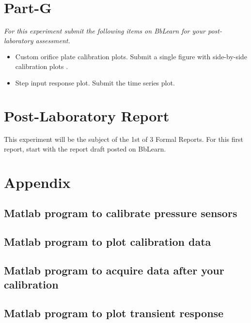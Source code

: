 \documentclass{article} %
\begin{document}
\section{Part-G}
\emph{For this experiment submit the following items on BbLearn for your post-laboratory assessment.}
\begin{itemize}
\item Custom orifice plate calibration plots. Submit a single figure with side-by-side calibration plots .
\item Step input response plot. Submit the time series plot.
\end{itemize}

\section{Post-Laboratory Report}
This experiment will be the subject of the 1st of 3 Formal Reports.  For this first report, start with the report draft posted on BbLearn.


\section{Appendix}
%
%
\subsection{Matlab program to calibrate pressure sensors}
\label{app:calCode}

\clearpage
\subsection{Matlab program to plot calibration data}
\label{app:pltCalibration}

\clearpage
\subsection{Matlab program to acquire data after your calibration}
\label{app:mainDAQProgram}

%
\clearpage
\subsection{Matlab program to plot transient response}
\label{app:postLabTrans}

%
\end{document}
